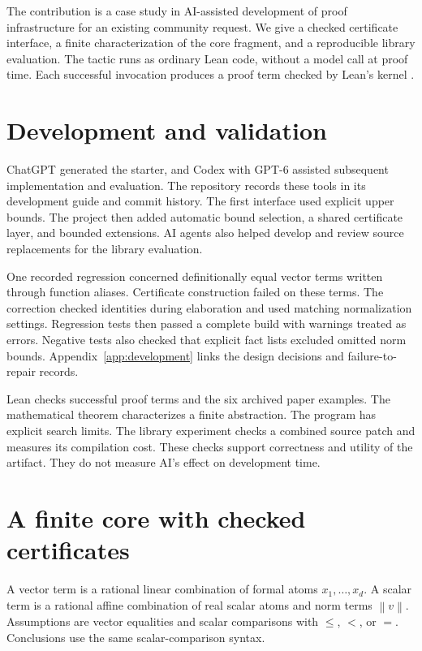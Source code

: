 \documentclass{article}
\newcommand{\norm}[1]{\left\lVert#1\right\rVert}
\begin{document}
The contribution is a case study in AI-assisted development of proof infrastructure for an existing community request.
We give a checked certificate interface, a finite characterization of the core fragment, and a reproducible library evaluation.
The tactic runs as ordinary Lean code, without a model call at proof time.
Each successful invocation produces a proof term checked by Lean's kernel \citep{lean4}.

\section{Development and validation}
\label{sec:development}
ChatGPT generated the starter, and Codex with GPT-6 assisted subsequent implementation and evaluation.
The repository records these tools in its development guide and commit history.
The first interface used explicit upper bounds.
The project then added automatic bound selection, a shared certificate layer, and bounded extensions.
AI agents also helped develop and review source replacements for the library evaluation.

One recorded regression concerned definitionally equal vector terms written through function aliases.
Certificate construction failed on these terms.
The correction checked identities during elaboration and used matching normalization settings.
Regression tests then passed a complete build with warnings treated as errors.
Negative tests also checked that explicit fact lists excluded omitted norm bounds.
Appendix~\ref{app:development} links the design decisions and failure-to-repair records.

Lean checks successful proof terms and the six archived paper examples.
The mathematical theorem characterizes a finite abstraction.
The program has explicit search limits.
The library experiment checks a combined source patch and measures its compilation cost.
These checks support correctness and utility of the artifact.
They do not measure AI's effect on development time.

\section{A finite core with checked certificates}
\label{sec:fragment}
A vector term is a rational linear combination of formal atoms $x_1,\ldots,x_d$.
A scalar term is a rational affine combination of real scalar atoms and norm terms $\norm{v}$.
Assumptions are vector equalities and scalar comparisons with $\le$, $<$, or $=$.
Conclusions use the same scalar-comparison syntax.
\end{document}
